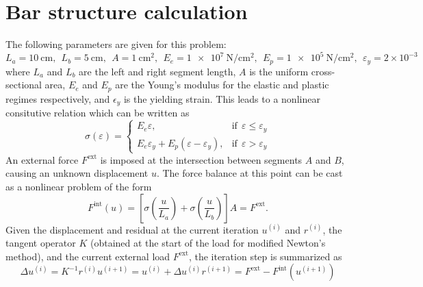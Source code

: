 \section{Bar structure calculation}
The following parameters are given for this problem:
\begin{equation}
    L_a = \qty{10}{\centi\meter}, ~~ L_b = \qty{5}{\centi\meter}, ~~ A = \qty{1}{\centi\meter\squared}, ~~ E_e = \qty[per-mode=symbol]{1e+7}{\newton\per\centi\meter\squared}, ~~ E_p = \qty[per-mode=symbol]{1e+5}{\newton\per\centi\meter\squared}, ~~ \varepsilon_y = 2\times 10^{-3}
\end{equation}
where $L_a$ and $L_b$ are the left and right segment length, $A$ is the uniform cross-sectional area, $E_e$ and $E_p$ are the Young's modulus for the elastic and plastic regimes respectively, and $\epsilon_y$ is the yielding strain. 
This leads to a nonlinear consitutive relation which can be written as 
\begin{equation}
    \sigma(\varepsilon) = \begin{cases}
        E_e \varepsilon, & \textrm{if} ~~\varepsilon \leq \varepsilon_y \\
        E_e \varepsilon_y + E_p(\varepsilon - \varepsilon_y), & \textrm{if} ~~\varepsilon > \varepsilon_y
    \end{cases}
\end{equation}
An external force $F^{\textrm{ext}}$ is imposed at the intersection between segments $A$ and $B$, causing an unknown displacement $u$. 
The force balance at this point can be cast as a nonlinear problem of the form 
\begin{equation}\label{eqn:hw1_p2_fint}
    F^{\textrm{int}}(u) = \left[\sigma\left(\frac{u}{L_a}\right) + \sigma\left(\frac{u}{L_b}\right)\right] A = F^{\textrm{ext}}.
\end{equation}
Given the displacement and residual at the current iteration $u^{(i)}$ and $r^{(i)}$, the tangent operator $K$ (obtained at the start of the load for modified Newton's method), and the current external load $F^{\textrm{ext}}$, the iteration step is summarized as 
\begin{subequations}
\begin{equation}\label{eqn:hw1_p2_du}
    \Delta u^{(i)} = K^{-1} r^{(i)}
\end{equation}
\begin{equation}\label{eqn:hw1_p2_u_update}
    u^{(i+1)} = u^{(i)} + \Delta u^{(i)}
\end{equation}
\begin{equation}\label{eqn:hw1_p2_r_update}
    r^{(i+1)} = F^{\textrm{ext}} - F^{\textrm{int}}(u^{(i+1)})
\end{equation}
\end{subequations}


